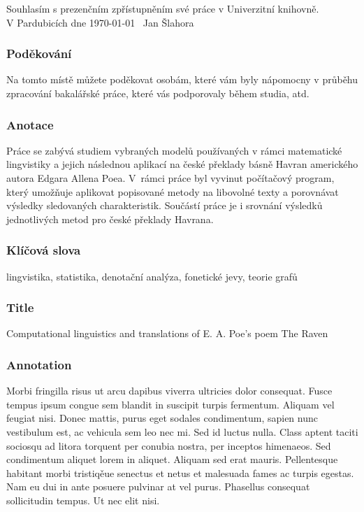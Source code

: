 \documentclass[11pt,a4paper,fleqn,titlepage,twoside,openany,export]{book}
\begin{document}
Souhlasím s prezenčním zpřístupněním své práce v Univerzitní knihovně.\\[4cm]
V Pardubicích dne \today\ \hfill{} Jan Šlahora

\newpage 
\thispagestyle{empty}
\subsubsection*{Poděkování}

Na tomto místě můžete poděkovat osobám, které vám byly nápomocny v průběhu zpracování bakalářské práce, které vás podporovaly během studia, atd.

\newpage 
\thispagestyle{empty}
\subsubsection*{Anotace}
Práce se zabývá studiem vybraných modelů používaných v rámci matematické lingvistiky a jejich následnou aplikací na české překlady básně Havran amerického autora Edgara Allena Poea. V~rámci práce byl vyvinut počítačový program, který umožňuje aplikovat popisované metody na libovolné texty a porovnávat výsledky sledovaných charakteristik. Součástí práce je i srovnání výsledků jednotlivých metod pro české překlady Havrana.

\vspace*{0.8cm}\subsubsection*{Klíčová slova} 	 	 		

lingvistika, statistika, denotační analýza, fonetické jevy, teorie grafů

\vspace*{2.8cm}\subsubsection*{Title}
Computational linguistics and translations of E. A. Poe's poem The Raven

\vspace*{0.8cm}\subsubsection*{Annotation}

Morbi fringilla risus ut arcu dapibus viverra ultricies dolor consequat. Fusce tempus ipsum congue sem blandit in suscipit turpis fermentum. Aliquam vel feugiat nisi. Donec mattis, purus eget sodales condimentum, sapien nunc vestibulum est, ac vehicula sem leo nec mi. Sed id luctus nulla. Class aptent taciti sociosqu ad litora torquent per conubia nostra, per inceptos himenaeos. Sed condimentum aliquet lorem in aliquet. Aliquam sed erat mauris. Pellentesque habitant morbi tristiqěue senectus et netus et malesuada fames ac turpis egestas. Nam eu dui in ante posuere pulvinar at vel purus. Phasellus consequat sollicitudin tempus. Ut nec elit nisi. 
\end{document}
